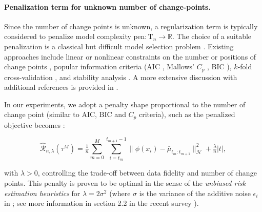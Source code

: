 

        \paragraph{Penalization term for unknown number of change-points.\\}
        
        Since the number of change points is unknown, a regularization term is typically considered to penalize model complexity $\text{pen}: \mathrm{T}_n \to \mathbb{R}$. The choice of a suitable penalization is a classical but difficult model selection problem \cite{Lavielle2005,Brodsky1993}. Existing approaches include linear or nonlinear constraints on the number or positions of change points \cite{Verzelen2023, cpt, Zhang2007}, popular information criteria (AIC \cite{Akaike1998}, Mallows’ $C_p$ \cite{Mallows1973}, BIC \cite{Schwarz1978}), $k$-fold cross-validation \cite{Golub1979}, and stability analysis \cite{Liu2010, Meinshausen2010}. A more extensive discussion with additional references is provided in \cite{cpt}. 

        In our experiments, we adopt a penalty shape proportional to the number of change point (similar to AIC, BIC and $C_p$ criteria), such as the penalized objective becomes \cite{garreau2018consistent}:

        \begin{equation}
            \hat{\mathcal{R}}_{n, \lambda}(\tau^M) 
            = \tfrac{1}{n} \sum_{m=0}^M \sum_{i=t_m}^{t_{m+1}-1} 
            \big\| \phi(x_i) - \bar{\mu}_{t_m:t_{m+1}} \big\|_{\mathcal{H}}^2 + \tfrac{\lambda}{n} |t|, 
            \label{eq:opti-pen}
        \end{equation}

        with $\lambda > 0$, controlling the trade-off between data fidelity and number of change points. This penalty is proven to be optimal in the sense of the \textit{unbiased risk estimation heuristics} for $\lambda = 2 \sigma^2$ (where $\sigma$ is the variance of the additive noise $\epsilon_i$ in ; see more information in section 2.2 in the recent survey \cite{slop_heuristics_survey}). 
        
